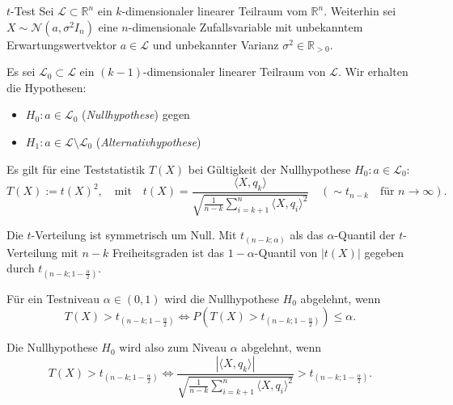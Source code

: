 \begin{defi}{$t$-Test}
    Sei $\mathcal{L} \subset \mathbb{R}^n$ ein $k$-dimensionaler linearer Teilraum vom $\mathbb{R}^n$.
    Weiterhin sei $X \sim \mathcal{N}(a, \sigma^2 I_n)$ eine $n$-dimensionale Zufallsvariable mit unbekanntem Erwartungswertvektor $a \in \mathcal{L}$ und unbekannter Varianz $\sigma^2 \in \mathbb{R}_{> 0}$.

    Es sei $\mathcal{L}_0 \subset \mathcal{L}$ ein $(k-1)$-dimensionaler linearer Teilraum von $\mathcal{L}$.
    Wir erhalten die Hypothesen:
    \begin{itemize}
        \item $H_0: a \in \mathcal{L}_0$ (\emph{Nullhypothese}) gegen
        \item $H_1: a \in \mathcal{L} \setminus \mathcal{L}_0$ (\emph{Alternativhypothese})
    \end{itemize}

    Es gilt für eine Teststatistik $T(X)$ bei Gültigkeit der Nullhypothese $H_0: a \in \mathcal{L}_0$:
    \[
        T(X) := t(X)^2, \quad \text{mit} \quad t(X) = \frac{\langle X, q_k \rangle}{\sqrt{\frac{1}{n - k} \sum_{i = k + 1}^{n} \langle X, q_i \rangle^2}} \quad \left( \sim t_{n - k} \quad \text{für } n \to \infty \right).
    \]

    Die $t$-Verteilung ist symmetrisch um Null.
    Mit $t_{(n - k; \alpha)}$ als das $\alpha$-Quantil der $t$-Verteilung mit $n - k$ Freiheitsgraden ist das $1 - \alpha$-Quantil von $|t(X)|$ gegeben durch $t_{(n - k; 1 - \frac{\alpha}{2})}$.

    Für ein Testniveau $\alpha \in (0, 1)$ wird die Nullhypothese $H_0$ abgelehnt, wenn
    \[
        T(X) > t_{(n - k; 1 - \frac{\alpha}{2})} \iff P(T(X) > t_{(n - k; 1 - \frac{\alpha}{2})}) \leq \alpha.
    \]

    Die Nullhypothese $H_0$ wird also zum Niveau $\alpha$ abgelehnt, wenn
    \[
        T(X) > t_{(n - k; 1 - \frac{\alpha}{2})} \iff \frac{|\langle X, q_k \rangle|}{\sqrt{\frac{1}{n - k} \sum_{i = k + 1}^{n} \langle X, q_i \rangle^2}} > t_{(n - k; 1 - \frac{\alpha}{2})}.
    \]
\end{defi}

